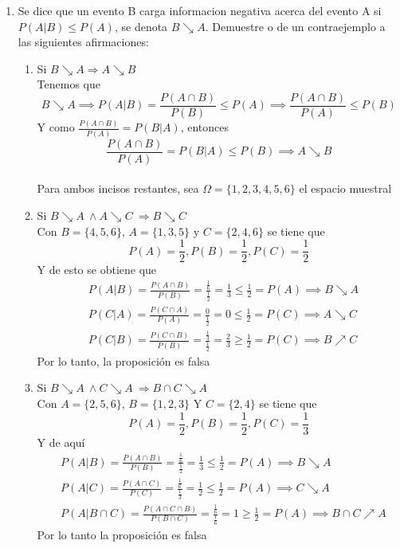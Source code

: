 \documentclass[12pt,a4paper]{report}
\begin{document}
\begin{enumerate}
{	\begin{enumerate}[label=\alph*) ]
   \item {
	Se dice que un evento B carga informacion negativa acerca del evento A si $P(A|B) \leq P(A)$, se denota  $B \searrow A$. Demuestre o de un contraejemplo a las siguientes afirmaciones:
		\begin{enumerate}
		\item{
			Si $B \searrow A \Rightarrow A \searrow B$ \\
			Tenemos que
			\[B \searrow A \implies P(A|B) = \frac{P(A \cap B)}{P(B)} \leq P(A) \implies \frac{P(A \cap B)}{P(A)} \leq P(B)\]
			Y como $\frac{P(A \cap B)}{P(A)} = P(B|A)$, entonces
			\[\frac{P(A \cap B)}{P(A)} = P(B|A) \leq P(B) \implies A \searrow B\]
		}\\
		Para ambos incisos restantes, sea $\Omega = \{1,2, 3, 4, 5, 6\}$ el espacio muestral
		\item{
			Si $B \searrow A \ \wedge A \searrow C \ \Rightarrow B \searrow C$\\
			Con $B = \{4, 5, 6\}$, $A = \{1, 3, 5\}$ y $C = \{2, 4, 6\}$ se tiene que
			\[P(A) = \frac{1}{2}, P(B) = \frac{1}{2}, P(C) = \frac{1}{2}\]
			Y de esto se obtiene que
			\begin{align*}
				&P(A|B) = \frac{P(A \cap B)}{P(B)} = \frac{\frac{1}{6}}{\frac{1}{2}}
				= \frac{1}{3} \leq \frac{1}{2} = P(A) \implies B \searrow A\\
				&P(C|A) = \frac{P(C \cap A)}{P(A)} = \frac{0}{\frac{1}{2}}
				= 0 \leq \frac{1}{2} = P(C) \implies A \searrow C\\
				&P(C|B) = \frac{P(C \cap B)}{P(B)} = \frac{\frac{1}{3}}{\frac{1}{2}}
				= \frac{2}{3} \geq \frac{1}{2} = P(C) \implies B \nearrow C
			\end{align*}
			Por lo tanto, la proposición es falsa
			}\\
		\item{
			Si $B \searrow A \ \wedge C \searrow A \ \Rightarrow B\cap C \searrow A$\\
			Con $A = \{2, 5, 6\}$, $B = \{1, 2, 3\}$ Y $C = \{2, 4\}$ se tiene que
			\[P(A) = \frac{1}{2}, P(B) = \frac{1}{2}, P(C) = \frac{1}{3}\]
			Y de aquí
			\begin{align*}
				&P(A|B) = \frac{P(A \cap B)}{P(B)} = \frac{\frac{1}{6}}{\frac{1}{2}}
				= \frac{1}{3} \leq \frac{1}{2} = P(A) \implies B \searrow A\\
				&P(A|C) = \frac{P(A \cap C)}{P(C)} = \frac{\frac{1}{6}}{\frac{1}{3}}
				= \frac{1}{2}\leq \frac{1}{2} = P(A) \implies C \searrow A\\
				&P(A|B \cap C) = \frac{P(A \cap C \cap B)}{P(B \cap C)} = \frac{\frac{1}{6}}{\frac{1}{6}}
				= 1 \geq \frac{1}{2} = P(A) \implies B \cap C \nearrow A
			\end{align*}
			Por lo tanto la proposición es falsa
		}
		\end{enumerate}
   }


\end{enumerate}}
\end{enumerate}
\end{document}
